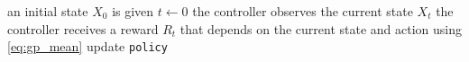 \begin{algorithm}[H]
  \DontPrintSemicolon
  an initial state $X_0$ is given \;
  $t \leftarrow 0$ \;
  {
      the controller observes the current state $X_t$ \;
      the controller receives a reward $R_t$ that
      depends on the current state and action \;
      using \eqref{eq:gp_mean} update \texttt{policy} \;
  }
\end{algorithm}
